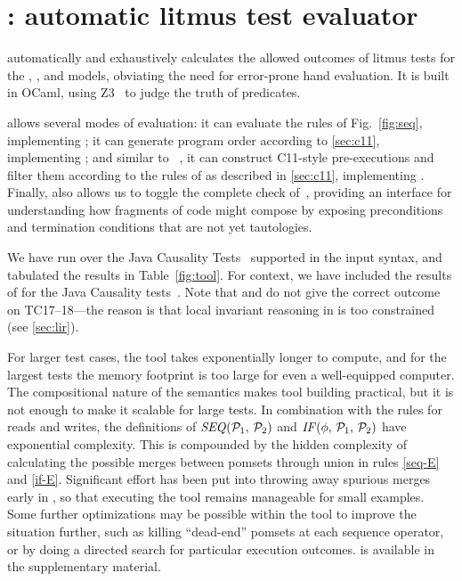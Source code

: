 
\section{\PwTerTITLE: automatic litmus test evaluator}
\label{sec:tool}

\PwTer{} automatically and exhaustively calculates the allowed outcomes of litmus tests for the \PwT, \PwTpo, and \PwTc{} models, obviating the need for error-prone hand evaluation. It is built in OCaml, using Z3~\cite{Z3Solver} to judge the truth of predicates. %

\PwTer{} allows several modes of evaluation: it can evaluate the rules of Fig.~\ref{fig:seq}, implementing \PwT; it can generate program order according to \textsection\ref{sec:c11}, implementing \PwTpo; and similar to \MRD~\cite{DBLP:conf/esop/PaviottiCPWOB20}, it can construct C11-style pre-executions and filter them according to the rules of \rcXI{} as described in \textsection\ref{sec:c11}, implementing \PwTc{}.
Finally, \PwTer{} also allows us to toggle the complete check of~, providing an interface for understanding how fragments of code might compose by exposing preconditions and termination conditions that are not yet tautologies.

We have run \PwTer{} over the Java Causality Tests~\cite{PughWebsite} supported in the input syntax, and tabulated the results in Table~\ref{fig:tool}.
For context, we have included the results of \MRD{} for the Java Causality tests~\cite{DBLP:conf/esop/PaviottiCPWOB20}.
Note that \MRD{} and \MRDRC{} do not give the correct outcome on TC17--18---the reason is that local invariant reasoning in \MRD{} is too constrained (see \textsection\ref{sec:lir}).

For larger test cases, the tool takes exponentially longer to compute, and for the largest tests the memory footprint is too large for even a well-equipped computer.
The compositional nature of the semantics makes tool building practical, but it is not enough to make it scalable for large tests.
In combination with the rules for reads and writes, the definitions of $\sSEMI{\aPSS_1}{\aPSS_2}$ and $\sIF{\aForm}\sTHEN\aPSS_1\sELSE\aPSS_2\sFI$ have exponential complexity.
This is compounded by the hidden complexity of calculating the possible merges between pomsets through union in rules \ref{seq-E} and \ref{if-E}.
Significant effort has been put into throwing away spurious merges early in \PwTer, so that executing the tool remains manageable for small examples.
Some further optimizations may be possible within the tool to improve the situation further, such as killing ``dead-end'' pomsets at each sequence operator, or by doing a directed search for particular execution outcomes.
\PwTer{} is available in the supplementary material.



